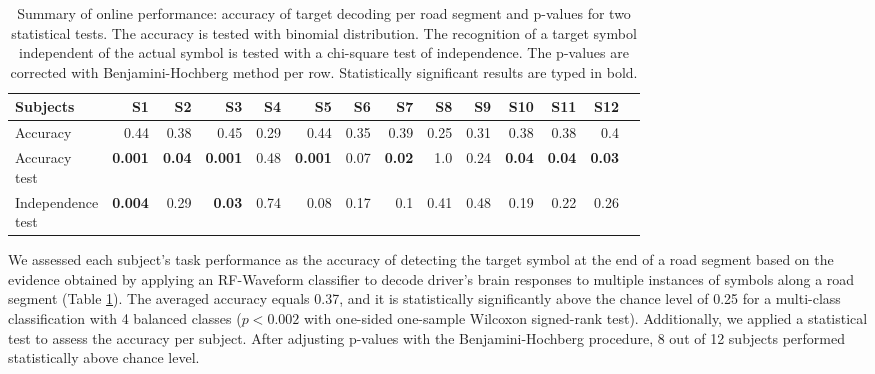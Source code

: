 \documentclass[12pt]{iopart}
\begin{document}
\begin{table}
    \centering
    \caption{Summary of online performance: accuracy of target decoding per road segment
        and p-values for two statistical tests. The accuracy is tested with binomial distribution.
        The recognition of a target symbol independent of the actual symbol is tested
        with a chi-square test of independence.  The p-values are corrected with Benjamini-Hochberg method per row.
    Statistically significant results are typed in bold.}
    \scriptsize
    \renewcommand{\arraystretch}{1.5}
    \begin{tabular}{l r r r r r r r r r r r r r}
        \hline
        Subjects & S1 & S2 & S3 & S4 & S5 & S6 & S7 & S8 & S9 & S10 & S11 & S12 \\
        \hline

        Accuracy & 0.44 & 0.38 & 0.45 & 0.29 & 0.44 & 0.35 & 0.39 & 0.25 & 0.31 & 0.38 & 0.38 & 0.4 \\ 
        \shortstack{Accuracy \\ test} & \textbf{0.001} & \textbf{0.04} & \textbf{0.001}
        & 0.48 & \textbf{0.001} & 0.07 & \textbf{0.02} & 1.0 & 0.24 & \textbf{0.04} & \textbf{0.04} & \textbf{0.03} \\
        \shortstack{Independence \\ test}  & \textbf{0.004} & 0.29 & \textbf{0.03} & 0.74
        & 0.08 & 0.17 & 0.1 & 0.41 & 0.48 & 0.19 & 0.22 & 0.26 \\
        \hline
    \end{tabular}
    \label{tab:onlineperf}
\end{table}

We assessed each subject's task performance as the accuracy of
detecting the target symbol at the end of a road segment based on the evidence obtained by applying an RF-Waveform classifier
to decode driver’s brain responses to multiple instances of symbols along a road segment (Table \ref{tab:onlineperf}).
The averaged accuracy 
equals 0.37, and it is statistically significantly above the chance level of 0.25 for
a multi-class classification with 4 balanced classes ($p < 0.002$ with one-sided one-sample Wilcoxon signed-rank test).
Additionally, we applied a statistical test to assess the accuracy per subject.
After adjusting p-values with the Benjamini-Hochberg procedure, 8 out of 12 subjects performed statistically above chance level.
\end{document}
